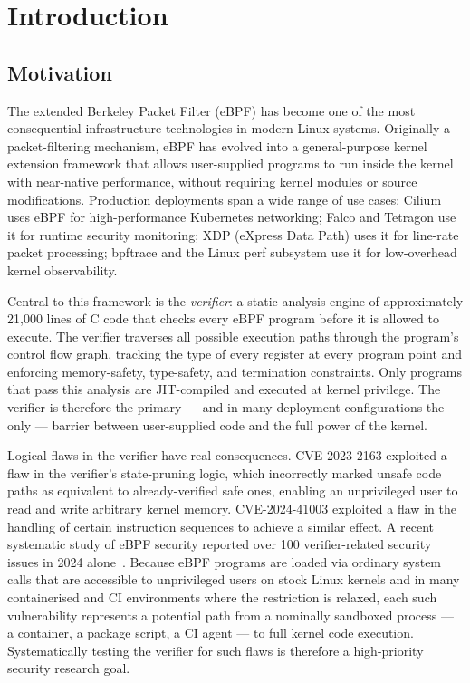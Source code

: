 \chapter{Introduction}
\label{ch:introduction}

\section{Motivation}
\label{sec:motivation}

The extended Berkeley Packet Filter (eBPF) has become one of the most consequential
infrastructure technologies in modern Linux systems.
Originally a packet-filtering mechanism, eBPF has evolved into a general-purpose
kernel extension framework that allows user-supplied programs to run inside the
kernel with near-native performance, without requiring kernel modules or source
modifications.
Production deployments span a wide range of use cases: Cilium uses eBPF for
high-performance Kubernetes networking; Falco and Tetragon use it for runtime
security monitoring; XDP (eXpress Data Path) uses it for line-rate packet
processing; bpftrace and the Linux perf subsystem use it for low-overhead
kernel observability.

Central to this framework is the \emph{verifier}: a static analysis engine of
approximately 21,000 lines of C code that checks every eBPF program before it is
allowed to execute.
The verifier traverses all possible execution paths through the program's control
flow graph, tracking the type of every register at every program point and
enforcing memory-safety, type-safety, and termination constraints.
Only programs that pass this analysis are JIT-compiled and executed at kernel
privilege.
The verifier is therefore the primary --- and in many deployment configurations the
only --- barrier between user-supplied code and the full power of the kernel.

Logical flaws in the verifier have real consequences.
CVE-2023-2163 exploited a flaw in the verifier's state-pruning logic, which
incorrectly marked unsafe code paths as equivalent to already-verified safe ones,
enabling an unprivileged user to read and write arbitrary kernel memory.
CVE-2024-41003 exploited a flaw in the handling of certain instruction sequences
to achieve a similar effect.
A recent systematic study of eBPF security reported over 100 verifier-related
security issues in 2024 alone~\cite{sok-ebpf}.
Because eBPF programs are loaded via ordinary system calls that are accessible to
unprivileged users on stock Linux kernels and in many containerised and CI
environments where the restriction is relaxed, each such vulnerability
represents a potential path from a nominally sandboxed process --- a container,
a package script, a CI agent --- to full kernel code execution.
Systematically testing the verifier for such flaws is therefore a high-priority
security research goal.

